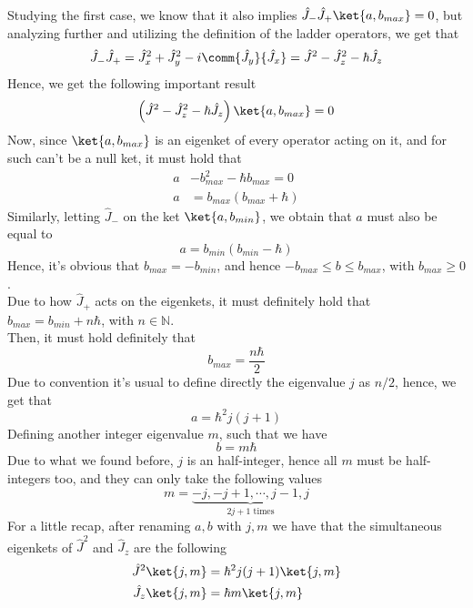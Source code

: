 \documentclass[a4paper, 11pt]{book}
\newcommand{\1}{\opr{\mathds{1}}}
\newcommand{\opr}[1]{\hat{#1}}
\newcommand{\ladopru}[1]{\opr{#1}_{+}}
\newcommand{\ladoprd}[1]{\opr{#1}_{-}}
\theoremstyle{plain}
\begin{document}
	Studying the first case, we know that it also implies $\opr{J}_-\opr{J}_+\ket{a,b_{max}}=0$, but analyzing further and utilizing the definition of the ladder operators, we get that
	\begin{equation*}
		\opr{J}_-\opr{J}_+=\opr{J}_x^2+\opr{J}_y^2-i\comm{\opr{J}_y}{\opr{J}_x}=\opr{J}^2-\opr{J}_z^2-\hbar\opr{J}_z
	\end{equation*}
	Hence, we get the following important result
	\begin{equation}
		\left( \opr{J}^2-\opr{J}_z^2-\hbar\opr{J}_z \right)\ket{a,b_{max}}=0
		\label{eq:ladderladder}
	\end{equation}
	Now, since $\ket{a,b_{max}}$ is an eigenket of every operator acting on it, and for such can't be a null ket, it must hold that
	\begin{equation}
		\begin{aligned}
			a&-b^2_{max}-\hbar b_{max}=0\\
			a&=b_{max}(b_{max}+\hbar)
		\end{aligned}
		\label{eq:eigenvalueeq}
	\end{equation}
	Similarly, letting $\ladoprd{J}$ on the ket $\ket{a,b_{min}}$, we obtain that $a$ must also be equal to
	\begin{equation*}
		a=b_{min}(b_{min}-\hbar)
	\end{equation*}
	Hence, it's obvious that $b_{max}=-b_{min}$, and hence $-b_{max}\le b\le b_{max}$, with $b_{max}\ge0$.\\
	Due to how $\ladopru{J}$ acts on the eigenkets, it must definitely hold that $b_{max}=b_{min}+n\hbar$, with $n\in\mathbb{N}$.\\
	Then, it must hold definitely that
	\begin{equation*}
		b_{max}=\frac{n\hbar}{2}
	\end{equation*}
	Due to convention it's usual to define directly the eigenvalue $j$ as $n/2$, hence, we get that
	\begin{equation}
		a=\hbar^2j(j+1)
		\label{eq:jsqeigenval}
	\end{equation}
	Defining another integer eigenvalue $m$, such that we have
	\begin{equation}
		b=m\hbar
		\label{eq:jzeigenvalue}
	\end{equation}
	Due to what we found before, $j$ is an half-integer, hence all $m$ must be half-integers too, and they can only take the following values
	\begin{equation}
		m=\underbrace{-j,-j+1,\cdots,j-1,j}_{2j+1\text{ times}}
		\label{eq:mdef}
	\end{equation}
	For a little recap, after renaming $a,b$ with $j,m$ we have that the simultaneous eigenkets of $\opr{J}^2$ and $\opr{J}_z$ are the following
	\begin{equation}
		\begin{aligned}
			\opr{J}^2\ket{j,m}&=\hbar^2j(j+1)\ket{j,m}\\
			\opr{J}_z\ket{j,m}&=\hbar m\ket{j,m}
		\end{aligned}
		\label{eq:eigenketsangmom}
	\end{equation}
\end{document}
